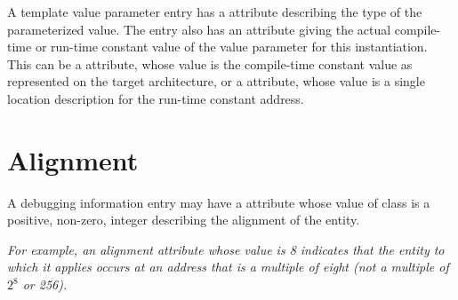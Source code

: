 A template value parameter entry has a \DWATtype{} attribute
describing the type of the parameterized value.
The entry also has an attribute giving the
actual compile-time or run-time constant value
of the value parameter for this instantiation.
This can be a
\DWATconstvalueDEFN{} attribute,
whose value is the compile-time constant value
as represented on the target architecture, or a
\DWATlocation{} attribute, whose value is a
single location description for the run-time constant address.

\section{Alignment}
\label{chap:alignment}
A debugging information entry may have a
\DWATalignmentDEFN{} attribute
whose value of class \CLASSconstant{} is
a positive, non-zero, integer describing the
alignment of the entity.

\textit{For example, an alignment attribute whose value is 8 indicates
that the entity to which it applies occurs at an address that is a
multiple of eight (not a multiple of $2^8$ or 256).}
